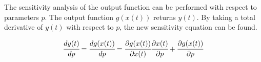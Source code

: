 \documentclass[../Article_Model_Parameters.tex]{subfiles}
\begin{document}
	The sensitivity analysis of the output function can be performed with respect to parameters ${p}$. The output function ${g}({x}(t))$ returns ${y}(t)$. By taking a total derivative of ${y}(t)$ with respect to ${p}$, the new sensitivity equation can be found.
	
	{\footnotesize
		\begin{align}
			\cfrac{d {y}(t)}{d{p}} = \cfrac{d {g}({x}(t))}{d{p}} = \cfrac{\partial {g}({x}(t))}{\partial {x}(t)} \cfrac{\partial {x}(t)}{\partial {p}} + \cfrac{\partial {g}({x}(t))}{\partial {p}}
	\end{align} }
	
%	
%		
	
\end{document}
